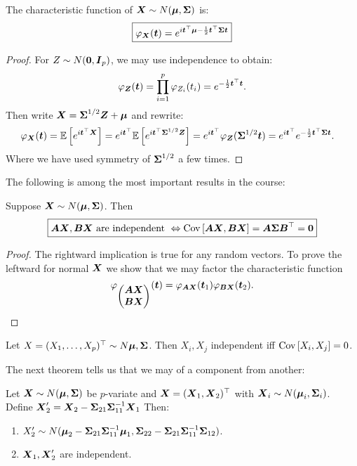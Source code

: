 \begin{theorem}
    The characteristic function of $\X\sim N(\M, \SS)$ is:
    \begin{equation}
        \boxed{\phi_{\X}(\mt) = e^{ i \mt^\top\M - \frac{1}{2}\mt^\top\SS\mt}}
    \end{equation}
\end{theorem}
\begin{proof}
    For $Z\sim N(\zero, \mI_p)$, we may use independence to obtain:
    $$
        \phi_{\Z}(\mt) = \prod_{i=1}^p \phi_{Z_i}(t_i) = e^{-\frac{1}{2} \mt^\top\mt}.
    $$
    Then write $\X=\SS^{1/2} \Z + \M$ and rewrite:
    \begin{align*}
        \phi_{\X}(\mt) 
        &= \ev{e^{i\mt^\top\X}}
        = e^{i\mt^\top}\ev{e^{i\mt^\top\SS^{1/2}\Z}}
        = e^{i\mt^\top}\phi_{\Z}(\SS^{1/2}\mt)
        = e^{i\mt^\top}e^{-\frac{1}{2} \mt^\top\SS\mt}.
    \end{align*}
    Where we have used symmetry of $\SS^{1/2}$ a few times.
\end{proof}
The following is among the most important results in the course:
\begin{theorem}
    Suppose $\X\sim N(\M, \SS)$. Then 
    \begin{equation}
        \boxed{\mA \X, \mB \X \textrm{ are independent } \Leftrightarrow \cov{\mA \X, \mB \X} = \mA\SS\mB^\top = \zero}
    \end{equation} 
\end{theorem}
\begin{proof}
    The rightward implication is true for any random vectors. To prove the leftward for normal $\X$ we show that we may factor the characteristic function 
    $$
    \phi_{\begin{pmatrix}
        \mA \X \\ \mB \X
    \end{pmatrix}} (\mt) 
    = \phi_{\mA\X} (\mt_1) \phi_{\mB\X} (\mt_2).
    $$
\end{proof}
\begin{corollary}
    Let $X = (X_1,\dots,X_p)^\top\sim N{\M, \SS}$. Then $X_i, X_j$ independent iff $\cov{X_i,X_j}=0$.
\end{corollary}
The next theorem tells us that we may  of a component from another:
\begin{theorem}
    Let $\X\sim N(\M, \SS)$ be $p$-variate and $\X=(\X_1,\X_2)^\top$ with $\X_i\sim N(\M_i, \SS_i)$. Define $\X_2' = \X_2 - \SS_{21}\SS_{11}^{-1} \X_1$ Then:
    \begin{enumerate}
        \item $X_2'\sim N(\M_2 - \SS_{21}\SS_{11}^{-1}\M_1, \SS_{22} - \SS_{21}\SS_{11}^{-1}\SS_{12})$.
        \item $\X_1, \X_2'$ are independent.
    \end{enumerate}
\end{theorem}

